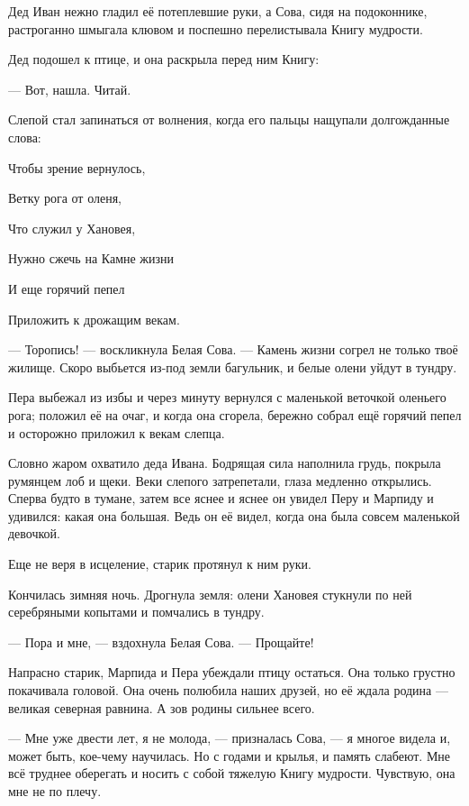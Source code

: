 \documentclass[oneside,final,14pt]{extreport}
\begin{document}
	Дед Иван нежно гладил её потеплевшие руки, а Сова, сидя на подоконнике, растроганно шмыгала клювом и поспешно перелистывала Книгу мудрости.
	
	Дед подошел к птице, и она раскрыла перед ним Книгу:
	
	— Вот, нашла. Читай.
	
	Слепой стал запинаться от волнения, когда его пальцы нащупали долгожданные слова:
	
	
	
	
\qquad \qquad \qquad 	Чтобы зрение вернулось,
	
\qquad \qquad \qquad 	Ветку рога от оленя,
	
\qquad \qquad \qquad 	Что служил у Хановея,
	
\qquad \qquad \qquad 	Нужно сжечь на Камне жизни
	
\qquad \qquad \qquad 	И еще горячий пепел
	
\qquad \qquad \qquad 	Приложить к дрожащим векам.
	
	
	— Торопись! — воскликнула Белая Сова. — Камень жизни согрел не только твоё жилище. Скоро выбьется из-под земли багульник, и белые олени уйдут в тундру.
	
	Пера выбежал из избы и через минуту вернулся с маленькой веточкой оленьего рога; положил её на очаг, и когда она сгорела, бережно собрал ещё горячий пепел и осторожно приложил к векам слепца.
	
	Словно жаром охватило деда Ивана. Бодрящая сила наполнила грудь, покрыла румянцем лоб и щеки. Веки слепого затрепетали, глаза медленно открылись. Сперва будто в тумане, затем все яснее и яснее он увидел Перу и Марпиду и удивился: какая она большая. Ведь он её видел, когда она была совсем маленькой девочкой.
	
	Еще не веря в исцеление, старик протянул к ним руки.
	
	Кончилась зимняя ночь. Дрогнула земля: олени Хановея стукнули по ней серебряными копытами и помчались в тундру.
	
	— Пора и мне, — вздохнула Белая Сова. — Прощайте!
	
	Напрасно старик, Марпида и Пера убеждали птицу остаться. Она только грустно покачивала головой. Она очень полюбила наших друзей, но её ждала родина — великая северная равнина. А зов родины сильнее всего.
	
	— Мне уже двести лет, я не молода, — призналась Сова, — я многое видела и, может быть, кое-чему научилась. Но с годами и крылья, и память слабеют. Мне всё труднее оберегать и носить с собой тяжелую Книгу мудрости. Чувствую, она мне не по плечу.
	
\end{document}
